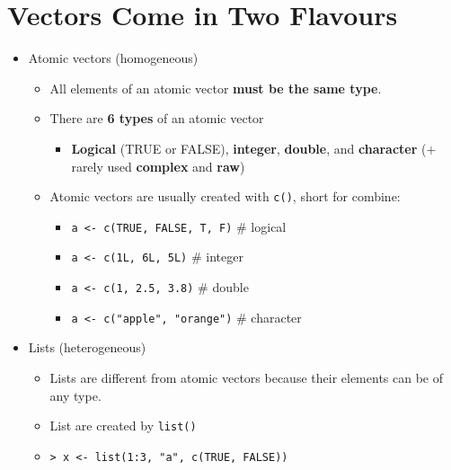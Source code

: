 \documentclass[]{book}
\providecommand{\tightlist}{%
  \setlength{\itemsep}{0pt}\setlength{\parskip}{0pt}}
\begin{document}
\section{Vectors Come in Two
Flavours}\label{vectors-come-in-two-flavours}

\begin{itemize}
\tightlist
\item
  Atomic vectors (homogeneous)

  \begin{itemize}
  \tightlist
  \item
    All elements of an atomic vector \textbf{must be the same type}.
  \item
    There are \textbf{6 types} of an atomic vector

    \begin{itemize}
    \tightlist
    \item
      \textbf{Logical} (TRUE or FALSE), \textbf{integer},
      \textbf{double}, and \textbf{character} (+ rarely used
      \textbf{complex} and \textbf{raw})
    \end{itemize}
  \item
    Atomic vectors are usually created with \texttt{c()}, short for
    combine:

    \begin{itemize}
    \tightlist
    \item
      \texttt{a\ \textless{}-\ c(TRUE,\ FALSE,\ T,\ F)} \# logical
    \item
      \texttt{a\ \textless{}-\ c(1L,\ 6L,\ 5L)} \# integer
    \item
      \texttt{a\ \textless{}-\ c(1,\ 2.5,\ 3.8)} \# double
    \item
      \texttt{a\ \textless{}-\ c("apple",\ "orange")} \# character
    \end{itemize}
  \end{itemize}
\item
  Lists (heterogeneous)

  \begin{itemize}
  \tightlist
  \item
    Lists are different from atomic vectors because their elements can
    be of any type.
  \item
    List are created by \texttt{list()}
  \item
    \texttt{\textgreater{}\ x\ \textless{}-\ list(1:3,\ "a",\ c(TRUE,\ FALSE))}
  \end{itemize}
\end{itemize}
\end{document}
